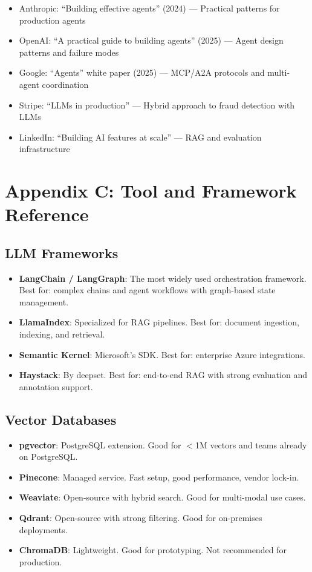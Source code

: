\begin{itemize}[leftmargin=*]
    \item Anthropic: ``Building effective agents'' (2024) --- Practical patterns for production agents
    \item OpenAI: ``A practical guide to building agents'' (2025) --- Agent design patterns and failure modes
    \item Google: ``Agents'' white paper (2025) --- MCP/A2A protocols and multi-agent coordination
    \item Stripe: ``LLMs in production'' --- Hybrid approach to fraud detection with LLMs
    \item LinkedIn: ``Building AI features at scale'' --- RAG and evaluation infrastructure
\end{itemize}


\section{Appendix C: Tool and Framework Reference}

\subsection{LLM Frameworks}

\begin{itemize}[leftmargin=*]
    \item \textbf{LangChain / LangGraph}: The most widely used orchestration framework. Best for: complex chains and agent workflows with graph-based state management.
    \item \textbf{LlamaIndex}: Specialized for RAG pipelines. Best for: document ingestion, indexing, and retrieval.
    \item \textbf{Semantic Kernel}: Microsoft's SDK. Best for: enterprise Azure integrations.
    \item \textbf{Haystack}: By deepset. Best for: end-to-end RAG with strong evaluation and annotation support.
\end{itemize}

\subsection{Vector Databases}

\begin{itemize}[leftmargin=*]
    \item \textbf{pgvector}: PostgreSQL extension. Good for $<$1M vectors and teams already on PostgreSQL.
    \item \textbf{Pinecone}: Managed service. Fast setup, good performance, vendor lock-in.
    \item \textbf{Weaviate}: Open-source with hybrid search. Good for multi-modal use cases.
    \item \textbf{Qdrant}: Open-source with strong filtering. Good for on-premises deployments.
    \item \textbf{ChromaDB}: Lightweight. Good for prototyping. Not recommended for production.
\end{itemize}


